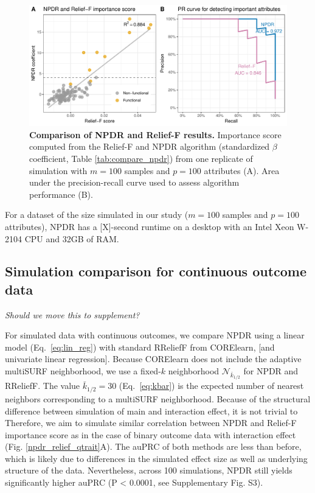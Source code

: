 \documentclass[10pt]{article}
\begin{document}
\begin{figure}[!tbp]
\centerline{\includegraphics[trim = 0 0 0 0]{../figs/npdr_relief_cc.pdf}}
\caption{{\bf Comparison of NPDR and Relief-F results.} Importance score computed from the Relief-F and NPDR algorithm (standardized $\beta$ coefficient, Table \ref{tab:compare_npdr}) from one replicate of simulation with $m = 100$ samples and $p = 100$ attributes (A). Area under the precision-recall curve used to assess algorithm performance (B).}
\label{fig:npdr_relief_cc}
\end{figure}

For a dataset of the size simulated in our study ($m=100$ samples and $p=100$ attributes), NPDR has a [X]-second runtime on a desktop with an Intel Xeon W-2104 CPU and 32GB of RAM. 


\subsection{Simulation comparison for continuous outcome data} 
\emph{Should we move this to supplement?}

For simulated data with continuous outcomes, we compare NPDR using a linear model (Eq.~\ref{eq:lin_reg}) with standard RReliefF from CORElearn, [and univariate linear regression].
Because CORElearn does not include the adaptive multiSURF neighborhood, we use a fixed-$k$ neighborhood $\mathcal{N}_{\bar{k}_{1/2}}$ for NPDR and RReliefF.
The value $\bar{k}_{1/2}=30$ (Eq.~\ref{eq:kbar}) is the expected number of nearest neighbors corresponding to a multiSURF neighborhood.
Because of the structural difference between simulation of main and interaction effect, it is not trivial to 
Therefore, we aim to simulate similar correlation between NPDR and Relief-F importance score as in the case of binary outcome data with interaction effect (Fig. \ref{npdr_relief_qtrait}A).
The auPRC of both methods are less than before, which is likely due to differences in the simulated effect size as well as underlying structure of the data.
Nevertheless, across 100 simulations, NPDR still yields significantly higher auPRC (P < 0.0001, see Supplementary Fig. S3).
\end{document}
